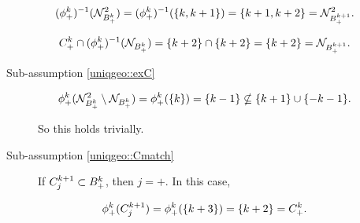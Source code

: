 \begin{description}
\begin{description}
\[(\phi^{k}_+)^{-1}(\mathcal{N}^2_{B^{k}_+}) = (\phi^{k}_+)^{-1}(\{k,k+1\}) = \{k+1,k+2\} = \mathcal{N}^2_{B^{k+1}_+}.\]

\[C^{k}_+\cap (\phi^{k}_+)^{-1}(\mathcal{N}_{B^{k}_+}) = \{k+2\}\cap\{k+2\} = \{k+2\} = \mathcal{N}_{B^{k+1}_+}.\]

\item[Sub-assumption \ref{uniqgeo::exC}]

\[\phi^{k}_+(\mathcal{N}^2_{B^{k}_+}\setminus\mathcal{N}_{B^{k}_+}) = \phi^{k}_+(\{k\}) = \{k-1\} \nsubseteq \{k+1\}\cup\{-k-1\}.\]

So this holds trivially.

\item[Sub-assumption \ref{uniqgeo::Cmatch}] If \(C^{k+1}_j \subset B^{k}_+\), then \(j = +\). In this case,

\[\phi^{k}_+(C^{k+1}_j) = \phi^{k}_+(\{k+3\}) = \{k+2\} = C^{k}_+.\]

\end{description}
\end{description}
\newpage



